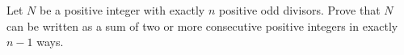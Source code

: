 Let $N$ be a positive integer with exactly $n$ positive odd divisors. Prove that $N$ can be written as a sum of two or more consecutive positive integers in exactly $n-1$ ways.
